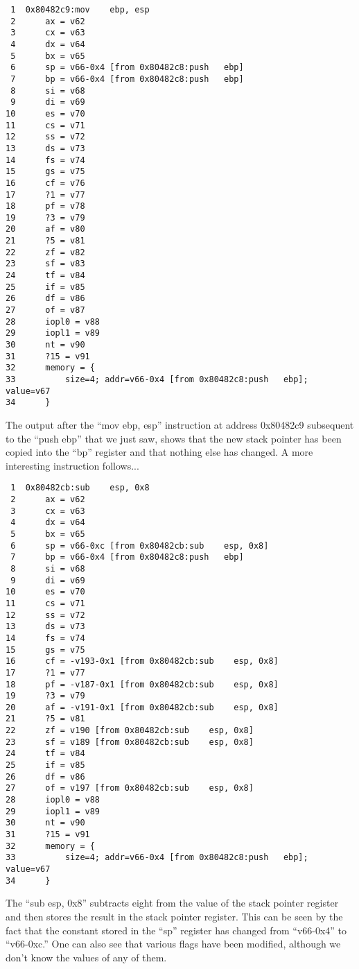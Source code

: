 \begin{verbatim}
 1  0x80482c9:mov    ebp, esp
 2      ax = v62
 3      cx = v63
 4      dx = v64
 5      bx = v65
 6      sp = v66-0x4 [from 0x80482c8:push   ebp]
 7      bp = v66-0x4 [from 0x80482c8:push   ebp]
 8      si = v68
 9      di = v69
10      es = v70
11      cs = v71
12      ss = v72
13      ds = v73
14      fs = v74
15      gs = v75
16      cf = v76
17      ?1 = v77
18      pf = v78
19      ?3 = v79
20      af = v80
21      ?5 = v81
22      zf = v82
23      sf = v83
24      tf = v84
25      if = v85
26      df = v86
27      of = v87
28      iopl0 = v88
29      iopl1 = v89
30      nt = v90
31      ?15 = v91
32      memory = {
33          size=4; addr=v66-0x4 [from 0x80482c8:push   ebp]; value=v67
34      }
\end{verbatim}

The output after the ``mov ebp, esp'' instruction at address
0x80482c9 subsequent to the ``push ebp'' that we just saw, shows that
the new stack pointer has been copied into the ``bp'' register and
that nothing else has changed.  A more interesting instruction
follows...

\begin{verbatim}
 1  0x80482cb:sub    esp, 0x8
 2      ax = v62
 3      cx = v63
 4      dx = v64
 5      bx = v65
 6      sp = v66-0xc [from 0x80482cb:sub    esp, 0x8]
 7      bp = v66-0x4 [from 0x80482c8:push   ebp]
 8      si = v68
 9      di = v69
10      es = v70
11      cs = v71
12      ss = v72
13      ds = v73
14      fs = v74
15      gs = v75
16      cf = -v193-0x1 [from 0x80482cb:sub    esp, 0x8]
17      ?1 = v77
18      pf = -v187-0x1 [from 0x80482cb:sub    esp, 0x8]
19      ?3 = v79
20      af = -v191-0x1 [from 0x80482cb:sub    esp, 0x8]
21      ?5 = v81
22      zf = v190 [from 0x80482cb:sub    esp, 0x8]
23      sf = v189 [from 0x80482cb:sub    esp, 0x8]
24      tf = v84
25      if = v85
26      df = v86
27      of = v197 [from 0x80482cb:sub    esp, 0x8]
28      iopl0 = v88
29      iopl1 = v89
30      nt = v90
31      ?15 = v91
32      memory = {
33          size=4; addr=v66-0x4 [from 0x80482c8:push   ebp]; value=v67
34      }
\end{verbatim}

The ``sub esp, 0x8'' subtracts eight from the value of the stack
pointer register and then stores the result in the stack pointer
register. This can be seen by the fact that the constant stored in the
``sp'' register has changed from ``v66-0x4'' to ``v66-0xc.'' One can
also see that various flags have been modified, although we don't know
the values of any of them.

